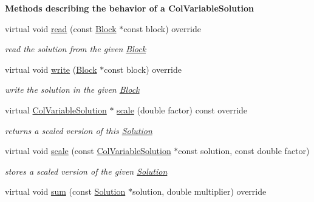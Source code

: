 \begin{Indent}\textbf{ Methods describing the behavior of a Col\+Variable\+Solution}\par
\begin{DoxyCompactItemize}
\item 
virtual void \mbox{\hyperlink{class_s_m_spp__di__unipi__it_1_1_col_variable_solution_a13487898d41f593b3cc0ae6a69feb3ff}{read}} (const \mbox{\hyperlink{class_s_m_spp__di__unipi__it_1_1_block}{Block}} $\ast$const block) override
\begin{DoxyCompactList}\small\item\em read the solution from the given \mbox{\hyperlink{class_s_m_spp__di__unipi__it_1_1_block}{Block}} \end{DoxyCompactList}\item 
virtual void \mbox{\hyperlink{class_s_m_spp__di__unipi__it_1_1_col_variable_solution_a99a9429b60ac714f7a4b5cbe4c0a96e4}{write}} (\mbox{\hyperlink{class_s_m_spp__di__unipi__it_1_1_block}{Block}} $\ast$const block) override
\begin{DoxyCompactList}\small\item\em write the solution in the given \mbox{\hyperlink{class_s_m_spp__di__unipi__it_1_1_block}{Block}} \end{DoxyCompactList}\item 
virtual \mbox{\hyperlink{class_s_m_spp__di__unipi__it_1_1_col_variable_solution}{Col\+Variable\+Solution}} $\ast$ \mbox{\hyperlink{class_s_m_spp__di__unipi__it_1_1_col_variable_solution_ae540e7cdfd7d10111ae795606dfa58e2}{scale}} (double factor) const override
\begin{DoxyCompactList}\small\item\em returns a scaled version of this \mbox{\hyperlink{class_s_m_spp__di__unipi__it_1_1_solution}{Solution}} \end{DoxyCompactList}\item 
virtual void \mbox{\hyperlink{class_s_m_spp__di__unipi__it_1_1_col_variable_solution_a09f298a3b695814cde2e7835071081fd}{scale}} (const \mbox{\hyperlink{class_s_m_spp__di__unipi__it_1_1_col_variable_solution}{Col\+Variable\+Solution}} $\ast$const solution, const double factor)
\begin{DoxyCompactList}\small\item\em stores a scaled version of the given \mbox{\hyperlink{class_s_m_spp__di__unipi__it_1_1_solution}{Solution}} \end{DoxyCompactList}\item 
virtual void \mbox{\hyperlink{class_s_m_spp__di__unipi__it_1_1_col_variable_solution_abf263a2361d4099d9fe7fd4cddc7f7ec}{sum}} (const \mbox{\hyperlink{class_s_m_spp__di__unipi__it_1_1_solution}{Solution}} $\ast$solution, double multiplier) override

\end{DoxyCompactItemize}
\end{Indent}
